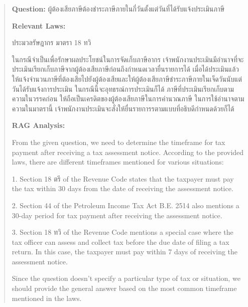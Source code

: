 \begin{quote}
    \begin{thai}
    \textbf{Question: } ผู้ต้องเสียภาษีต้องชำระภาษีภายในกี่วันตั้งแต่วันที่ได้รับแจ้งประเมินภาษี

    
    \textbf{Relevant Laws: }
    
    ประมวลรัษฎากร มาตรา 18 ทวิ 
    
    ในกรณีจำเป็นเพื่อรักษาผลประโยชน์ในการจัดเก็บภาษีอากร เจ้าพนักงานประเมินมีอำนาจที่จะประเมินเรียกเก็บภาษีจากผู้ต้องเสียภาษีก่อนถึงกำหนดเวลายื่นรายการได้ เมื่อได้ประเมินแล้วให้แจ้งจำนวนภาษีที่ต้องเสียไปยังผู้ต้องเสียและให้ผู้ต้องเสียภาษีชำระภาษีภายในเจ็ดวันนับแต่วันได้รับแจ้งการประเมิน ในกรณีนี้จะอุทธรณ์การประเมินก็ได้
    ภาษีที่ประเมินเรียกเก็บตามความในวรรคก่อน ให้ถือเป็นเครดิตของผู้ต้องเสียภาษีในการคำนวณภาษี
    ในการใช้อำนาจตามความในมาตรานี้ เจ้าพนักงานประเมินจะสั่งให้ยื่นรายการรตามแบบที่อธิบดีกำหนดด้วยก็ได้ 

    \textbf{RAG Analysis: }

    From the given question, we need to determine the timeframe for tax payment after receiving a tax assessment notice. According to the provided laws, there are different timeframes mentioned for various situations:
    
    1. Section 18 ตรี of the Revenue Code states that the taxpayer must pay the tax within 30 days from the date of receiving the assessment notice.
    
    2. Section 44 of the Petroleum Income Tax Act B.E. 2514 also mentions a 30-day period for tax payment after receiving the assessment notice.
    
    3. Section 18 ทวิ of the Revenue Code mentions a special case where the tax officer can assess and collect tax before the due date of filing a tax return. In this case, the taxpayer must pay within 7 days of receiving the assessment notice.
    
    Since the question doesn't specify a particular type of tax or situation, we should provide the general answer based on the most common timeframe mentioned in the laws. 

    \end{thai}
\end{quote}


